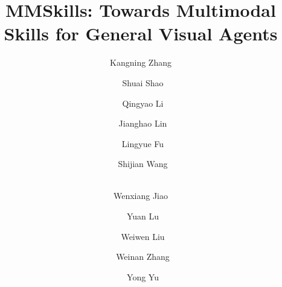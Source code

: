 \documentclass[]{selfevolagent}
\title{MMSkills: Towards Multimodal Skills for General Visual Agents}
\author[1,2\ddagger*]{Kangning Zhang}
\author[1,2\ddagger*]{~Shuai Shao}
\author[1,2*]{~Qingyao Li}
\author[1]{~Jianghao Lin}
\author[1]{~Lingyue Fu}
\author[3]{~Shijian Wang}
\author[2,\corrauth]{\\Wenxiang Jiao}
\author[2,\corrauth]{~Yuan Lu}
\author[1,\corrauth]{~Weiwen Liu}
\author[1,\corrauth]{~Weinan Zhang}
\author[1,\corrauth]{~Yong Yu}
\affiliation[1]{Shanghai Jiao TongUniversity}
\affiliation[2]{Xiaohongshu Inc.}
\affiliation[3]{Southeast University}
\theoremstyle{plain}
\theoremstyle{definition}
\theoremstyle{remark}
\begin{document}
\maketitle










\newpage
\beginappendix

\end{document}

